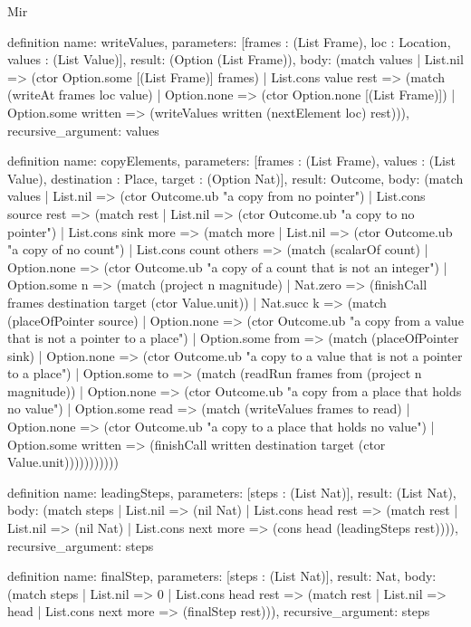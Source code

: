 \begin{lexlean}{Mir}
\begin{semanticmodule}
definition{
  name: writeValues,
  parameters: [frames : (List Frame), loc : Location, values : (List Value)],
  result: (Option (List Frame)),
  body: (match values
    | List.nil => (ctor Option.some [(List Frame)] frames)
    | List.cons value rest => (match (writeAt frames loc value)
      | Option.none => (ctor Option.none [(List Frame)])
      | Option.some written => (writeValues written (nextElement loc) rest))),
  recursive_argument: values
}

definition{
  name: copyElements,
  parameters: [frames : (List Frame), values : (List Value), destination : Place, target : (Option Nat)],
  result: Outcome,
  body: (match values
    | List.nil => (ctor Outcome.ub "a copy from no pointer")
    | List.cons source rest => (match rest
      | List.nil => (ctor Outcome.ub "a copy to no pointer")
      | List.cons sink more => (match more
        | List.nil => (ctor Outcome.ub "a copy of no count")
        | List.cons count others => (match (scalarOf count)
          | Option.none => (ctor Outcome.ub "a copy of a count that is not an integer")
          | Option.some n => (match (project n magnitude)
            | Nat.zero => (finishCall frames destination target (ctor Value.unit))
            | Nat.succ k => (match (placeOfPointer source)
              | Option.none => (ctor Outcome.ub "a copy from a value that is not a pointer to a place")
              | Option.some from => (match (placeOfPointer sink)
                | Option.none => (ctor Outcome.ub "a copy to a value that is not a pointer to a place")
                | Option.some to => (match (readRun frames from (project n magnitude))
                  | Option.none => (ctor Outcome.ub "a copy from a place that holds no value")
                  | Option.some read => (match (writeValues frames to read)
                    | Option.none => (ctor Outcome.ub "a copy to a place that holds no value")
                    | Option.some written => (finishCall written destination target (ctor Value.unit)))))))))))
}

definition{
  name: leadingSteps,
  parameters: [steps : (List Nat)],
  result: (List Nat),
  body: (match steps
    | List.nil => (nil Nat)
    | List.cons head rest => (match rest
      | List.nil => (nil Nat)
      | List.cons next more => (cons head (leadingSteps rest)))),
  recursive_argument: steps
}

definition{
  name: finalStep,
  parameters: [steps : (List Nat)],
  result: Nat,
  body: (match steps
    | List.nil => 0
    | List.cons head rest => (match rest
      | List.nil => head
      | List.cons next more => (finalStep rest))),
  recursive_argument: steps
}


\end{semanticmodule}
\end{lexlean}
